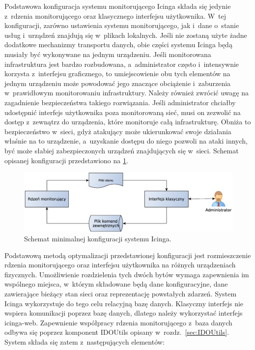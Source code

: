 Podstawowa konfiguracja systemu monitorującego Icinga składa się
jedynie z~rdzenia monitorującego oraz klasycznego interfejsu
użytkownika. W~tej konfiguracji, zarówno ustawienia systemu
monitorującego, jak i~dane o~stanie usług i~urządzeń znajdują się
w~plikach lokalnych. Jeśli nie zostaną użyte żadne dodatkowe
mechanizmy transportu danych, obie części systemu Icinga będą musiały
być wykonywane na jednym urządzeniu. Jeśli monitorowana infrastruktura
jest bardzo rozbudowana, a~administrator często i~intensywnie korzysta
z~interfejsu graficznego, to umiejscowienie obu tych elementów na
jednym urządzeniu może powodować jego znaczące obciążenie i~zaburzenia
w~prawidłowym monitorowaniu infrastruktury. Należy również zwrócić
uwagę na zagadnienie bezpieczeństwa takiego rozwiązania. Jeśli
administrator chciałby udostępnić interfejs użytkownika poza
monitorowaną sieć, musi on zezwolić na dostęp z~zewnątrz do
urządzenia, które monitoruje całą infrastrukturę. Obniża to
bezpieczeństwo w~sieci, gdyż atakujący może ukierunkować swoje
działania właśnie na to urządzenie, a~uzyskanie dostępu do niego
pozwoli na ataki innych, być może słabiej zabezpieczonych urządzeń
znajdujących się w~sieci. Schemat opisanej konfiguracji przedstawiono
na \ref{fig:icingaMini}.

\begin{figure}[ht]
  \caption{Schemat minimalnej konfiguracji systemu Icinga.}
  \label{fig:icingaMini}
\includegraphics[width=1\textwidth]{img/icingaMini}
\end{figure}

Podstawową metodą optymalizacji przedstawionej konfiguracji jest
rozmieszczenie rdzenia monitorującego oraz interfejsu użytkownika na
różnych urządzeniach fizycznych. Umożliwienie rozdzielenia tych dwóch
bytów wymaga zapewnienia im wspólnego miejsca, w~którym składowane
będą dane konfiguracyjne, dane zawierające bieżący stan sieci oraz
reprezentację powstałych zdarzeń. System Icinga wykorzystuje do tego
celu relacyjną bazę danych. Klasyczny interfejs nie wspiera
komunikacji poprzez bazę danych, dlatego należy wykorzystać interfejs
icinga-web. Zapewnienie współpracy rdzenia monitorującego z~baza
danych odbywa się poprzez komponent IDOUtils opisany
w~rozdz.~\ref{sec:IDOUtils}. System składa się zatem z~następujących
elementów:

